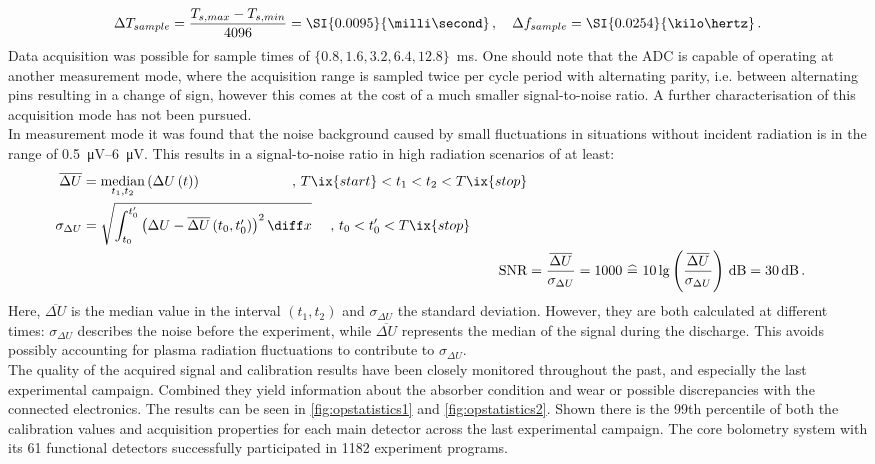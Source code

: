 %
            \begin{align}%
                \Delta T_{sample}=\frac{T_{s, max}-T_{s, min}}{4096}=\text{\SI{0.0095}{\milli\second}}\,,\quad\Delta f_{sample}=\text{\SI{0.0254}{\kilo\hertz}}\,.\nonumber%
            \end{align}%
%
            Data acquisition was possible for sample times of $\{0.8, 1.6, 3.2, 6.4, 12.8\}$\SI{}{\milli\second}. One should note that the ADC is capable of operating at another measurement mode, where the acquisition range is sampled twice per cycle period with alternating parity, i.e. between alternating pins resulting in a change of sign, however this comes at the cost of a much smaller signal-to-noise ratio. A further characterisation of this acquisition mode has not been pursued.\\%
            In measurement mode it was found that the noise background caused by small fluctuations in situations without incident radiation is in the range of \SIrange{0.5}{6}{\micro\volt}. This results in a signal-to-noise ratio in high radiation scenarios of at least:%
%
            \begin{align}%
                \begin{split}\label{eq:median_sigma}%
                    \overline{\Delta U}&=\underset{t_{1},t_{2}}{\text{median}}\left(\Delta U\left(t\right)\right)\qquad\qquad\qquad\,\,\,,\,T\ix{start}<t_{1}<t_{2}<T\ix{stop}\\%
                    \sigma_{\Delta U}&=\sqrt{\int_{t_{0}}^{t_{0}^\prime}\left(\Delta U-\overline{\Delta U}\left(t_{0},t_{0}^\prime\right)\right)^2\diff x}\quad\,\,,\,t_{0}<t_{0}^\prime<T\ix{stop}%
                \end{split}\\%
                \text{SNR}&=\frac{\overline{\Delta U}}{\sigma_{\Delta U}}=1000\,\,\widehat{=}\,\,10\lg\left(\frac{\overline{\Delta U}}{\sigma_{\Delta U}}\right)\,\text{dB}=30\,\text{dB}\,.\nonumber%
            \end{align}%
%
            Here, $\overline{\Delta U}$ is the median value in the interval $\left(t_{1},t_{2}\right)$ and $\sigma_{\Delta U}$ the standard deviation. However, they are both calculated at different times: $\sigma_{\Delta U}$ describes the noise before the experiment, while $\overline{\Delta U}$ represents the median of the signal during the discharge. This avoids possibly accounting for plasma radiation fluctuations to contribute to $\sigma_{\Delta U}$.\\%
            The quality of the acquired signal and calibration results have been closely monitored throughout the past, and especially the last experimental campaign. Combined they yield information about the absorber condition and wear or possible discrepancies with the connected electronics. The results can be seen in \cref{fig:opstatistics1} and \cref{fig:opstatistics2}. Shown there is the 99th percentile of both the calibration values and acquisition properties for each main detector across the last experimental campaign. The core bolometry system with its 61 functional detectors successfully participated in 1182 experiment programs.\\%
